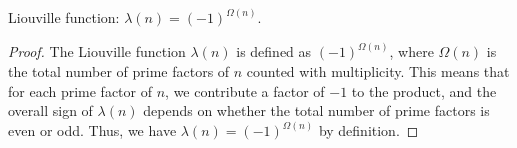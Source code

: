 \begin{theorem}[liouville]
\label{liouville}
\leanok
Liouville function: $\lambda(n) = (-1)^{\Omega(n)}$.
\end{theorem}
\begin{proof}
\leanok
The Liouville function $\lambda(n)$ is defined as $(-1)^{\Omega(n)}$, where $\Omega(n)$ is the total number of prime factors of $n$ counted with multiplicity. This means that for each prime factor of $n$, we contribute a factor of $-1$ to the product, and the overall sign of $\lambda(n)$ depends on whether the total number of prime factors is even or odd. Thus, we have $\lambda(n) = (-1)^{\Omega(n)}$ by definition.
\end{proof}
